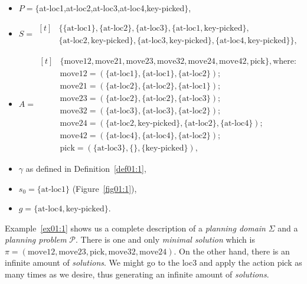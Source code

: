 \begin{itemize}
    \item $P=\{${at-loc1,at-loc2,at-loc3,at-loc4,key-picked}$\}$,
    
    \item $S=\begin{aligned}[t]
    &\{\{ \mathrm{at\text{-}loc1}\}, \{ \mathrm{at\text{-}loc2}\}, \{ \mathrm{at\text{-}loc3}\}, \{ \mathrm{at\text{-}loc1,key\text{-}picked}\},\\
    & \{ \mathrm{at\text{-}loc2,key\text{-}picked}\},
    \{ \mathrm{at\text{-}loc3,key\text{-}picked}\}, \{ \mathrm{at\text{-}loc4,key\text{-}picked}\}\},
    \end{aligned}$

    \item $A=\begin{aligned}[t]
    &\mathrm{\{move12,move21,move23,move32,move24,move42,pick\}, where:} \\
    &\mathrm{move12 = (\{at\text{-}loc1\},\{at\text{-}loc1\},\{at\text{-}loc2\});} \\
    &\mathrm{move21 = (\{at\text{-}loc2\},\{at\text{-}loc2\},\{at\text{-}loc1\});} \\
    &\mathrm{move23 = (\{at\text{-}loc2\},\{at\text{-}loc2\},\{at\text{-}loc3\});} \\
    &\mathrm{move32 = (\{at\text{-}loc3\},\{at\text{-}loc3\},\{at\text{-}loc2\});} \\
    &\mathrm{move24 = (\{at\text{-}loc2,key\text{-}picked\},\{at\text{-}loc2\},\{at\text{-}loc4\});} \\
    &\mathrm{move42 = (\{at\text{-}loc4\},\{at\text{-}loc4\},\{at\text{-}loc2\});} \\
    &\mathrm{pick = (\{at\text{-}loc3\},\{\},\{key\text{-}picked\}),}
    \end{aligned}$ 

    \item $\gamma$ as defined in Definition~\ref{def01:1},

    \item $s_0 = \{ \mathrm{at\text{-}loc1}\}$ (Figure~\ref{fig01:1}),

    \item $g = \{ \mathrm{at\text{-}loc4, key\text{-}picked}\}$.
\end{itemize}

\noindent
Example~\ref{ex01:1} shows us a complete description of a \emph{planning domain} $\Sigma$ and a \emph{planning problem} $\mathcal{P}$. There is one and only \emph{minimal solution} which is $\pi=(\mathrm{move12,move23,pick,move32,move24})$. On the other hand, there is an infinite amount of \emph{solutions}. We might go to the loc3 and apply the action pick as many times as we desire, thus generating an infinite amount of \emph{solutions}.

